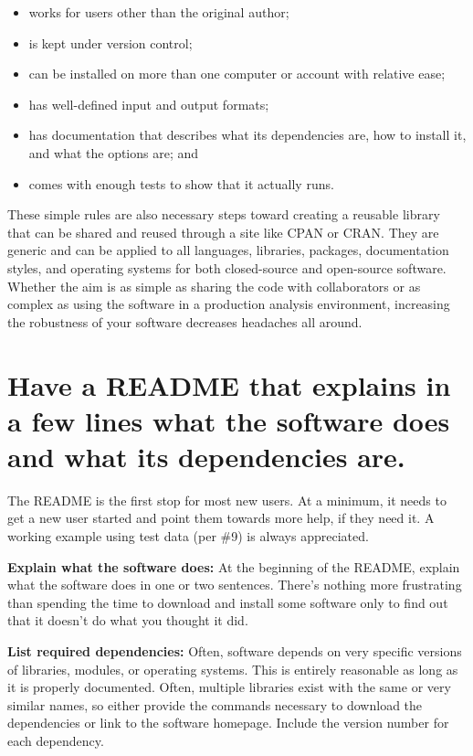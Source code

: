 \documentclass[10pt,letterpaper]{article}
\begin{document}
\begin{itemize}
\item
  works for users other than the original author;
\item
  is kept under version control;
\item
  can be installed on more than one computer or account with relative ease;
\item
  has well-defined input and output formats;
\item
  has documentation that describes what its dependencies are, how to
  install it, and what the options are; and
\item
  comes with enough tests to show that it actually runs.
\end{itemize}

These simple rules are also necessary steps toward creating a reusable
library that can be shared and reused through a site like CPAN or CRAN.  They are
generic and can be applied to all languages, libraries, packages,
documentation styles, and operating systems for both closed-source and
open-source software.  
Whether the aim is as simple as sharing the
code with collaborators or as complex as using the software in a
production analysis environment, increasing the robustness of your
software decreases headaches all around.

\section{Have a README that explains in a few lines what the software does and what its dependencies are.}

The README is the first stop for most new users.
At a minimum, it needs to get a new user started and point them towards more
help, if they need it.
A working example using test data (per
\#9) is always appreciated.

\textbf{Explain what the software does:} At the beginning of the README,
explain what the software does in one or two sentences.
There's nothing more frustrating
than spending the time to download and install some software only to
find out that it doesn't do what you thought it did.

\textbf{List required dependencies:} Often, software depends on very
specific versions of libraries, modules, or operating systems. This is
entirely reasonable as long as it is properly documented. Often,
multiple libraries exist with the same or very similar names, so
either provide the commands necessary to download the dependencies or
link to the software homepage. Include the version number for each
dependency.  
\end{document}
